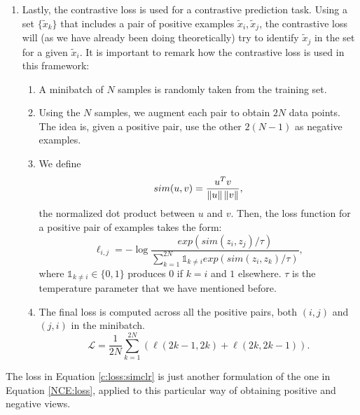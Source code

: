 \begin{enumerate}
\item Lastly, the contrastive loss is used for a contrastive prediction task. Using a set $\{\tilde x_k \}$ that includes a pair of positive examples $\tilde x_i,\tilde x_j$, the contrastive loss will (as we have already been doing theoretically) try to identify $\tilde x_j$ in the set for a given $\tilde x_i$. It is important to remark how the contrastive loss is used in this framework:
\begin{enumerate}
\item A minibatch of $N$ samples is randomly taken from the training set. 
\item Using the $N$ samples, we augment each pair to obtain $2N$ data points. The idea is, given a positive pair, use the other $2(N-1)$ as negative examples.
\item We define
\[
sim(u,v) = \frac{u^T v}{\left\lVert u\right\rVert\left\lVert v\right\rVert},    
\]
the normalized dot product between $u$ and $v$. Then, the loss function for a positive pair of examples takes the form:
\begin{equation}\label{c:loss:simclr:ind}
\ell_{i,j} = -\log \frac{exp(sim(z_i,z_j)/\tau)}{\sum_{k=1}^{2N} \mathbb{1}_{k \neq i} exp(sim(z_i,z_k)/\tau)},    
\end{equation}
where $\mathbb{1}_{k \neq i} \in \{0,1\}$ produces $0$ if $k = i$ and $1$ elsewhere. $\tau$ is the temperature parameter that we have mentioned before.
\item The final loss is computed across all the positive pairs, both $(i,j)$ and $(j,i)$ in the minibatch.
\begin{equation}\label{c:loss:simclr}
\mathcal L = \frac{1}{2N} \sum_{k=1}^{2N} \left(\ell(2k-1,2k) + \ell(2k,2k-1)\right).
\end{equation}
\end{enumerate}
\end{enumerate}
\begin{remark}
The loss in Equation \eqref{c:loss:simclr} is just another formulation of the one in Equation \eqref{NCE:loss}, applied to this particular way of obtaining positive and negative views.
\end{remark}


